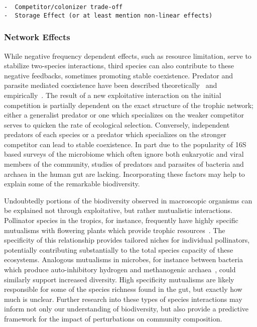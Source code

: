 \documentclass[12pt]{article}
\begin{document}
\begin{verbatim}
-  Competitor/colonizer trade-off
-  Storage Effect (or at least mention non-linear effects)
\end{verbatim}

\subsubsection{Network Effects}
While negative frequency dependent effects,
such as resource limitation,
serve to stabilize two-species interactions,
third species can also contribute to these negative feedbacks,
sometimes promoting stable coexistence.
Predator and parasite mediated coexistence have been described
theoretically~\citep{Caswell1978} and
empirically~\citep{Paine1966,TODO}.
The result of a new exploitative interaction on the initial
competition is partially dependent on the exact structure of the
trophic network;
either a generalist predator or one which specializes on the weaker
competitor serves to quicken the rate of ecological selection.
Conversely, independent predators of each species or a predator
which specializes on the stronger competitor can lead to stable
coexistence.
In part due to the popularity of 16S based surveys of the
microbiome
which often ignore both eukaryotic
and viral members of the community,
studies of predators and parasites of bacteria and archaea
in the human gut are lacking.
Incorporating these factors may help to explain some of the
remarkable biodiversity.

Undoubtedly portions of the biodiversity observed in macroscopic
organisms can be explained not through exploitative,
but rather mutualistic interactions.
Pollinator species in the tropics, for instance, frequently
have highly specific mutualisms with flowering plants which
provide trophic resources~\citep{TODO}.
The specificity of this relationship provides tailored niches
for individual pollinators, potentially contributing substantially
to the total species capacity of these ecosystems.
Analogous mutualisms in microbes, for instance
between bacteria which produce auto-inhibitory hydrogen
and methanogenic archaea~\citep{TODO}, could similarly support increased
diversity.
High specificity mutualisms are likely responsible for some of the species
richness found in the gut,
but exactly how much is unclear.
Further research into these types of species interactions
may inform not only our understanding of biodiversity,
but also provide a predictive framework for the impact of
perturbations on community composition.
\end{document}

